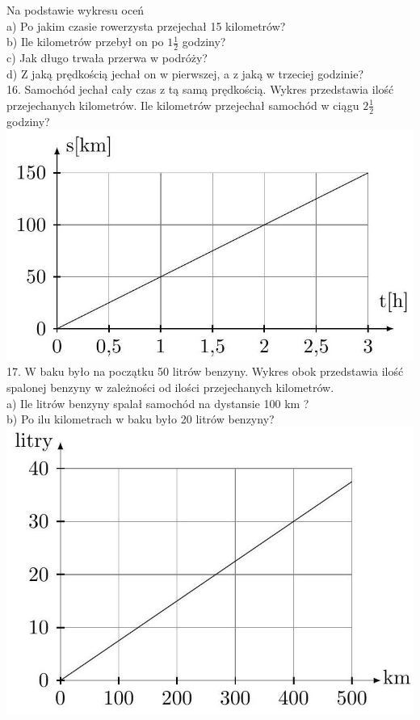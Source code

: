 \documentclass[10pt]{article}
\begin{document}
Na podstawie wykresu oceń\\
a) Po jakim czasie rowerzysta przejechał 15 kilometrów?\\
b) Ile kilometrów przebył on po \(1 \frac{1}{2}\) godziny?\\
c) Jak długo trwała przerwa w podróży?\\
d) Z jaką prędkością jechał on w pierwszej, a z jaką w trzeciej godzinie?\\
16. Samochód jechał cały czas z tą samą prędkością. Wykres przedstawia ilość przejechanych kilometrów. Ile kilometrów przejechał samochód w ciągu \(2 \frac{1}{2}\) godziny?\\
\includegraphics[max width=\textwidth, center]{2024_11_21_8f01584889ff06348ae7g-074(1)}\\
17. W baku było na początku 50 litrów benzyny. Wykres obok przedstawia ilość spalonej benzyny w zależności od ilości przejechanych kilometrów.\\
a) Ile litrów benzyny spalał samochód na dystansie 100 km ?\\
b) Po ilu kilometrach w baku było 20 litrów benzyny?\\
\includegraphics[max width=\textwidth, center]{2024_11_21_8f01584889ff06348ae7g-074}
\end{document}
